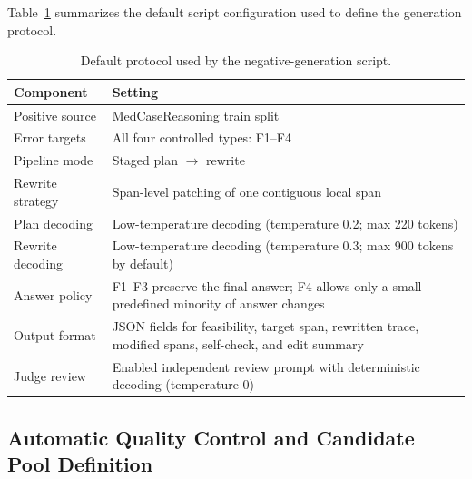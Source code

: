 \documentclass[a4paper,fleqn,doubleblind]{cas-sc}
\begin{document}
Table~\ref{tab:negative_protocol_defaults} summarizes the default script configuration used to define the generation protocol.

\begin{table}[htbp]
    \centering
    \caption{Default protocol used by the negative-generation script.}
    \label{tab:negative_protocol_defaults}
    \begin{tabular}{lp{}}
        \toprule
        \textbf{Component} & \textbf{Setting} \\
        \midrule
        Positive source & MedCaseReasoning train split \\
        Error targets & All four controlled types: F1--F4 \\
        Pipeline mode & Staged plan $\rightarrow$ rewrite \\
        Rewrite strategy & Span-level patching of one contiguous local span \\
        Plan decoding & Low-temperature decoding (temperature 0.2; max 220 tokens) \\
        Rewrite decoding & Low-temperature decoding (temperature 0.3; max 900 tokens by default) \\
        Answer policy & F1--F3 preserve the final answer; F4 allows only a small predefined minority of answer changes \\
        Output format & JSON fields for feasibility, target span, rewritten trace, modified spans, self-check, and edit summary \\
        Judge review & Enabled independent review prompt with deterministic decoding (temperature 0) \\
        \bottomrule
    \end{tabular}
\end{table}

\subsection{Automatic Quality Control and Candidate Pool Definition}
\end{document}
